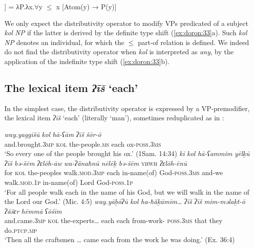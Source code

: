 \documentclass[output=paper]{langsci/langscibook}
\begin{document}
\ea%
    \label{ex:doron:45}\relax
    [[each]]  =   λP.λx.${\forall}$y ${\leq}$ x [Atom(y) → P(y)]
\z


We only expect the distributivity operator to modify VPs predicated of a subject \textit{kol} \textit{NP} if the latter is derived by the definite type shift (\ref{ex:doron:33}a). Such \textit{kol} \textit{NP} denotes an individual, for which the ${\leq}$  part-of relation is defined. We indeed do not find the distributivity operator when \textit{kol} is interpreted as \textit{any}, by the application of the indefinite type shift (\ref{ex:doron:33}b).

\subsection{The lexical item \textit{ʔīš} ‘each’}%
In the simplest case, the distributivity operator is expressed by a VP-premodifier, the lexical item \textit{ʔīš} ‘each’ (literally ‘man’), sometimes reduplicated as in :

\ea%
    \label{ex:doron:46}
    \ea
    \gll \textit{way.yaggīšū}          \textit{kol}    \textit{hā-ʕām}              \textit{ʔīš}     \textit{šōr-ō}                  \\
         and.brought\textsc{.3mp}   \textsc{kol} the-people.\textsc{ms}   each  ox-\textsc{poss.3ms}   \\
    \glt `So every one of the people brought his ox.' (1Sam. 14:34)
    \ex
    \gll \textit{kī}   \textit{kol}    \textit{hā-ʕammim}   \textit{yēlḵū}                   \textit{ʔīš}      \textit{bə-šēm}         \textit{ʔɛlōh-āw} \textit{wa-ʔănaħnū} \textit{nēlēḵ}                \textit{bə-šēm}        \textsc{yhwh}  \textit{ʔɛlōh-ēnū}\\
         for \textsc{kol}   the-peoples   walk.\textsc{mod.3mp}   each   in-name(of)  God-\textsc{poss.3ms} and-we         walk.\textsc{mod.1p}   in-name(of) Lord   God-\textsc{poss.1p}\\
    \glt `For all people walk each in the name of his God, but we will walk in the name of the Lord our God.' (Mic. 4:5)
    \z
\ex %
    \label{ex:doron:47}
    \gll \textit{way.yāḇōʔū}      \textit{kol}   \textit{ha-ħăḵāmīm…} \textit{ʔīš}     \textit{ʔīš}    \textit{mim-məlaḵt-ō}             \textit{ʔăšɛr}  \textit{hēmmā}  \textit{ʕōśīm}\\
         and.came\textsc{.3mp}  \textsc{kol} the-experts…   each each from-work- \textsc{poss.3ms} that    they       do.\textsc{ptcp.mp}\\
    \glt `Then all the craftsmen … came each from the work he was doing.' (Ex. 36:4)
\z
\end{document}
